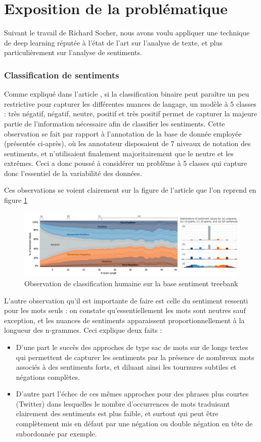 \documentclass[conference]{IEEEtran}
\begin{document}
\section{Exposition de la problématique}
Suivant le travail de Richard Socher, nous avons voulu appliquer une technique de deep learning réputée à l'état de l'art sur l'analyse de texte, et plus particulièrement sur l'analyse de sentiments.

\subsubsection{Classification de sentiments}
Comme expliqué dans l'article \cite{Socher-etal:2013}, si la classification binaire peut paraître un peu restrictive pour capturer les différentes nuances de langage, un modèle à 5 classes : très négatif, négatif, neutre, positif et très positif permet de capturer la majeure partie de l'information nécessaire afin de classifier les sentiments. Cette observation se fait par rapport à l'annotation de la base de donnée employée (présentée ci-après), où les annotateur disposaient de 7 niveaux de notation des sentiments, et n'utilisaient finalement majoritairement que le neutre et les extrêmes. Ceci a donc poussé à considérer un problème à 5 classes qui capture donc l'essentiel de la variabilité des données.

Ces observations se voient clairement sur la figure de l'article que l'on reprend en figure \ref{Sent}
\begin{figure}
\includegraphics[width=\textwidth]{fig/Sent.png}
\caption{Observation de classification humaine sur la base sentiment treebank}
\label{Sent}
\end{figure}

L'autre observation qu'il est importante de faire est celle du sentiment ressenti pour les mots seuls : on constate qu'essentiellement les mots sont neutres sauf exception, et les nuances de sentiments apparaissent proportionnellement à la longueur des n-grammes. Ceci explique deux faits :
\begin{itemize}
\item D'une part le succès des approches de type sac de mots sur de longs textes qui permettent de capturer les sentiments par la présence de nombreux mots associés à des sentiments forts, et diluant ainsi les tournures subtiles et négations complètes.
\item D'autre part l'échec de ces mêmes approches pour des phrases plus courtes (Twitter) dans lesquelles le nombre d'occurrences de mots traduisant clairement des sentiments est plus faible, et surtout qui peut être complètement mis en défaut par une négation ou double négation en tête de subordonnée par exemple.
\end{itemize}
\end{document}
